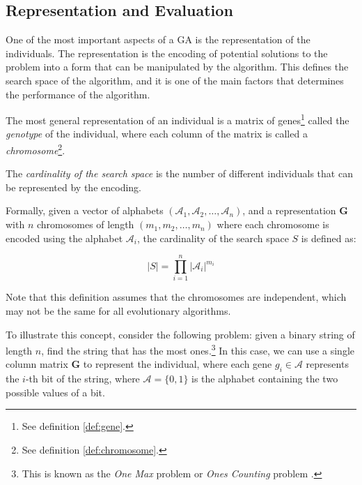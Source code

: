 \subsection{Representation and Evaluation}
\label{ssec:genetic_algorithms:representation}
  One of the most important aspects of a GA is the representation of the individuals.
  The representation is the encoding of potential solutions to the problem into a form that can be
  manipulated by the algorithm.
  This defines the search space of the algorithm, and it is one of the main factors that
  determines the performance of the algorithm.

  The most general representation of an individual is a matrix of genes\footnote{
    See definition \ref{def:gene}.
  } called the \emph{genotype} of the individual, where each column of the matrix is called a
  \emph{chromosome}\footnote{
    See definition \ref{def:chromosome}.
  }.
  
  \begin{definition}
  \label{def:cardinality_of_the_search_space}
    The \emph{cardinality of the search space} is the number of different individuals that 
    can be represented by the encoding.

    Formally, given a vector of alphabets \((\mathcal{A}_1, \mathcal{A}_2, \dots, \mathcal{A}_n)\), 
    and a representation \(\mathbf{G}\) with \(n\) chromosomes of length \((m_1, m_2, \dots, 
    m_n)\) where each chromosome is encoded using the alphabet \(\mathcal{A}_i\), the cardinality 
    of the search space \(S\) is defined as:
    
    \begin{equation}
      \label{eq:cardinality_of_the_search_space}
      |S| = \prod_{i=1}^n |\mathcal{A}_i|^{m_i}
    \end{equation}

    Note that this definition assumes that the chromosomes are independent, which may not be the 
    same for all evolutionary algorithms.
  \end{definition}

  To illustrate this concept, consider the following problem: given a binary string of length
  \(n\), find the string that has the most ones.\footnote{
    This is known as the \emph{One Max} problem \autocite{OneMaxProblema} or \emph{Ones Counting}
    problem \autocite{wilhelmstotterJeneticsJavaGenetica}.
  }
  In this case, we can use a single column matrix \(\mathbf{G}\) to represent the individual, 
  where each gene \(g_i \in \mathcal{A}\) represents the \(i\)-th bit of the string, where 
  \(\mathcal{A} = \{0, 1\}\) is the alphabet containing the two possible values of a bit.
  
